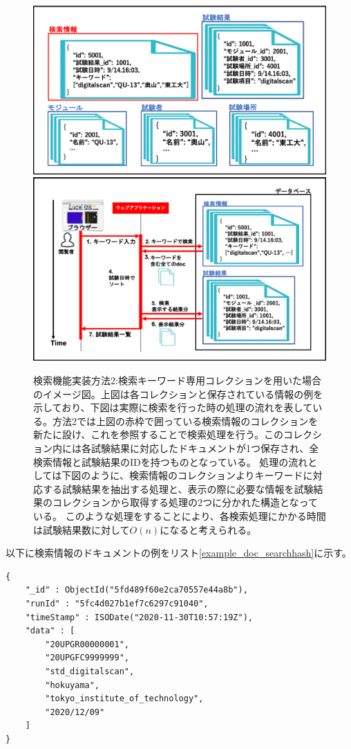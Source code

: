 \begin{figure}[bpt]
  \begin{center}
    \includegraphics[width=12cm]{./search_mongo_collection.png}
    \includegraphics[width=12cm]{./search_mongo_collection_flow.png}
  \caption[検索機能実装方法2:検索キーワード専用コレクションを用いた場合]{検索機能実装方法2:検索キーワード専用コレクションを用いた場合のイメージ図。上図は各コレクションと保存されている情報の例を示しており、下図は実際に検索を行った時の処理の流れを表している。方法2では上図の赤枠で囲っている検索情報のコレクションを新たに設け、これを参照することで検索処理を行う。このコレクション内には各試験結果に対応したドキュメントが1つ保存され、全検索情報と試験結果のIDを持つものとなっている。
処理の流れとしては下図のように、検索情報のコレクションよりキーワードに対応する試験結果を抽出する処理と、表示の際に必要な情報を試験結果のコレクションから取得する処理の2つに分かれた構造となっている。
このような処理をすることにより、各検索処理にかかる時間は試験結果数に対して$O(n)$になると考えられる。}
  \label{search_mongo_collection}
  \end{center}
\end{figure}

以下に検索情報のドキュメントの例をリスト\ref{example_doc_searchhash}に示す。
\begin{lstlisting}[basicstyle=\scriptsize,caption=検索情報コレクションに入るドキュメントの例。このように試験結果のID、試験日時、検索対象となる名前情報が保存される。,label=example_doc_searchhash]
{
	"_id" : ObjectId("5fd489f60e2ca70557e44a8b"),
	"runId" : "5fc4d027b1ef7c6297c91040",
	"timeStamp" : ISODate("2020-11-30T10:57:19Z"),
	"data" : [
		"20UPGR00000001",
		"20UPGFC9999999",
		"std_digitalscan",
		"hokuyama",
		"tokyo_institute_of_technology",
		"2020/12/09"
	]
}
\end{lstlisting}

